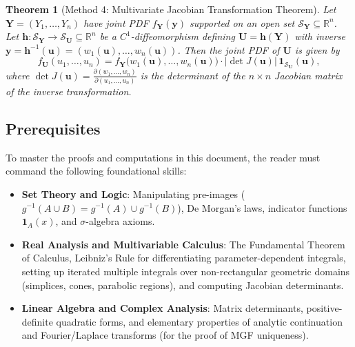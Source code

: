 \documentclass[11pt, letterpaper]{article}
\newtheorem{theorem}{Theorem}[section]
\theoremstyle{definition}
\theoremstyle{remark}
\newcommand{\R}{\mathbb{R}}
\begin{document}
\begin{theorem}[Method 4: Multivariate Jacobian Transformation Theorem]
\label{thm:jacobian}
Let $\mathbf{Y} = (Y_1, \dots, Y_n)$ have joint PDF $f_{\mathbf{Y}}(\mathbf{y})$ supported on an open set $\mathcal{S}_{\mathbf{Y}} \subseteq \R^n$. Let $\mathbf{h}: \mathcal{S}_{\mathbf{Y}} \to \mathcal{S}_{\mathbf{U}} \subseteq \R^n$ be a $C^1$-diffeomorphism defining $\mathbf{U} = \mathbf{h}(\mathbf{Y})$ with inverse $\mathbf{y} = \mathbf{h}^{-1}(\mathbf{u}) = (w_1(\mathbf{u}), \dots, w_n(\mathbf{u}))$. Then the joint PDF of $\mathbf{U}$ is given by
\[
    f_{\mathbf{U}}(u_1, \dots, u_n) = f_{\mathbf{Y}}\big(w_1(\mathbf{u}), \dots, w_n(\mathbf{u})\big) \cdot |\det J(\mathbf{u})| \, \mathbf{1}_{\mathcal{S}_{\mathbf{U}}}(\mathbf{u}),
\]
where $\det J(\mathbf{u}) = \frac{\partial(w_1, \dots, w_n)}{\partial(u_1, \dots, u_n)}$ is the determinant of the $n \times n$ Jacobian matrix of the inverse transformation.
\end{theorem}

\subsection{Prerequisites}

To master the proofs and computations in this document, the reader must command the following foundational skills:
\begin{itemize}
    \item \textbf{Set Theory and Logic}: Manipulating pre-images ($g^{-1}(A \cup B) = g^{-1}(A) \cup g^{-1}(B)$), De Morgan's laws, indicator functions $\mathbf{1}_A(x)$, and $\sigma$-algebra axioms.
    \item \textbf{Real Analysis and Multivariable Calculus}: The Fundamental Theorem of Calculus, Leibniz's Rule for differentiating parameter-dependent integrals, setting up iterated multiple integrals over non-rectangular geometric domains (simplices, cones, parabolic regions), and computing Jacobian determinants.
    \item \textbf{Linear Algebra and Complex Analysis}: Matrix determinants, positive-definite quadratic forms, and elementary properties of analytic continuation and Fourier/Laplace transforms (for the proof of MGF uniqueness).
\end{itemize}

\newpage
\end{document}
